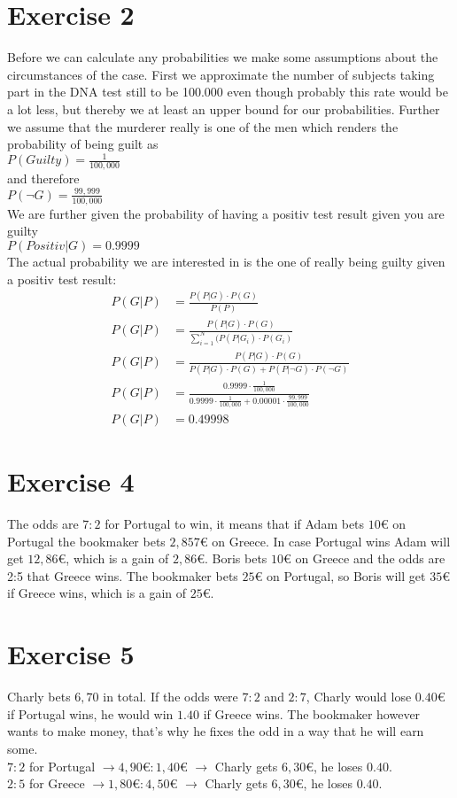 \def \TutorialSheetNumber{3}


\section*{Exercise 2}
Before we can calculate any probabilities we make some assumptions about the circumstances of the case. First we approximate the number of subjects taking part in the DNA test still to be 100.000 even though probably this rate would be a lot less, but thereby we at least an upper bound for our probabilities. Further we assume that the murderer really is one of the men which renders the probability of being guilt as \\ 
$P(Guilty) = \frac{1}{100,000}$\\
and therefore\\
$P(\neg G) = \frac{99,999}{100,000}$\\
We are further given the probability of having a positiv test result given you are guilty \\
$P(Positiv|G) = 0.9999 $ \\
The actual probability we are interested in is the one of really being guilty given a positiv test result:
\begin{align*}
  P(G | P) & = \frac{P(P|G) \cdot P(G)}{P(P)} \\
  P(G | P) & = \frac{P(P|G) \cdot P(G)}{\sum\limits_{i=1}^{N}(P(P|G_i)\cdot P(G_i)}\\
  P(G | P) & = \frac{P(P|G) \cdot P(G)}{P(P|G)\cdot P(G) + P(P|\neg G)\cdot P(\neg G)} \\
  P(G | P) & = \frac{0.9999 \cdot \frac{1}{100,000}}{0.9999 \cdot \frac{1}{100,000} + 0.00001 \cdot \frac{99,999}{100,000}}\\
  P(G | P) & = 0.49998
\end{align*}
 
\section*{Exercise 4}
The odds are $7 : 2$ for Portugal to win, it means that if Adam bets $10\euro$ on Portugal the bookmaker bets $2,857€$ on Greece. In case Portugal wins Adam will get $12,86€$, which is a gain of $2,86€$.
Boris bets $10€$ on Greece and the odds are 2:5 that Greece wins. The bookmaker bets $25€$ on Portugal, so Boris will get $35€$ if Greece wins, which is a gain of $25€$.

\section*{Exercise 5}
Charly bets $6,70$ in total.
If the odds were $7 : 2$ and $2 : 7$, Charly would lose $0.40€$ if Portugal wins, he would win $1.40$ if Greece wins. The bookmaker however wants to make money, that's why he fixes the odd in a way that he will earn some.\\
$7 : 2$ for Portugal $\rightarrow 4,90€ : 1,40€$ $\rightarrow$ Charly gets $6,30€$, he loses $0.40$.\\
$2 : 5$ for Greece $\rightarrow 1,80€ : 4,50€$ $\rightarrow$ Charly gets $6,30€$, he loses $0.40$.



